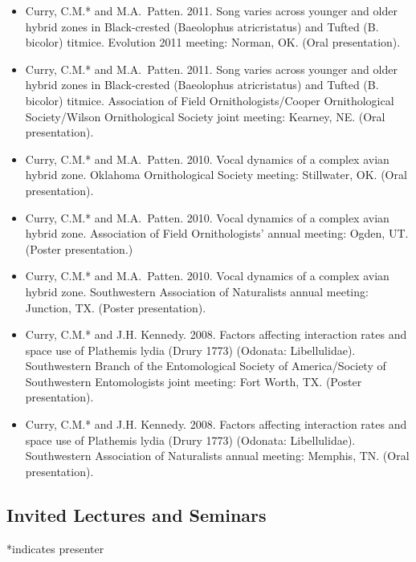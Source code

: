 \documentclass[
  letterpaper,
  DIV=11,
  numbers=noendperiod,
  oneside]{scrreprt}
\begin{document}
\begin{itemize}
\item
  Curry, C.M.* and M.A.~Patten. 2011. Song varies across younger and
  older hybrid zones in Black-crested (Baeolophus atricristatus) and
  Tufted (B. bicolor) titmice. Evolution 2011 meeting: Norman, OK. (Oral
  presentation).
\item
  Curry, C.M.* and M.A.~Patten. 2011. Song varies across younger and
  older hybrid zones in Black-crested (Baeolophus atricristatus) and
  Tufted (B. bicolor) titmice. Association of Field
  Ornithologists/Cooper Ornithological Society/Wilson Ornithological
  Society joint meeting: Kearney, NE. (Oral presentation).
\item
  Curry, C.M.* and M.A.~Patten. 2010. Vocal dynamics of a complex avian
  hybrid zone. Oklahoma Ornithological Society meeting: Stillwater, OK.
  (Oral presentation).
\item
  Curry, C.M.* and M.A.~Patten. 2010. Vocal dynamics of a complex avian
  hybrid zone. Association of Field Ornithologists' annual meeting:
  Ogden, UT. (Poster presentation.)
\item
  Curry, C.M.* and M.A.~Patten. 2010. Vocal dynamics of a complex avian
  hybrid zone. Southwestern Association of Naturalists annual meeting:
  Junction, TX. (Poster presentation).
\item
  Curry, C.M.* and J.H. Kennedy. 2008. Factors affecting interaction
  rates and space use of Plathemis lydia (Drury 1773) (Odonata:
  Libellulidae). Southwestern Branch of the Entomological Society of
  America/Society of Southwestern Entomologists joint meeting: Fort
  Worth, TX. (Poster presentation).
\item
  Curry, C.M.* and J.H. Kennedy. 2008. Factors affecting interaction
  rates and space use of Plathemis lydia (Drury 1773) (Odonata:
  Libellulidae). Southwestern Association of Naturalists annual meeting:
  Memphis, TN. (Oral presentation).
\end{itemize}

\subsection{Invited Lectures and
Seminars}\label{invited-lectures-and-seminars}

*indicates presenter
\end{document}
